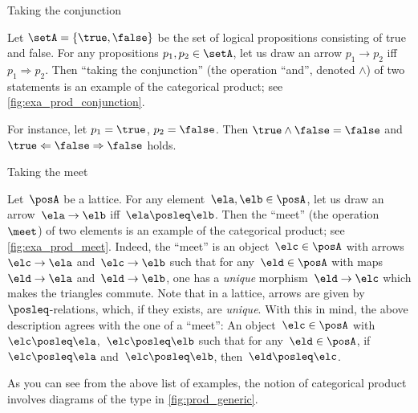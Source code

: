 \begin{marginfigure}
	\centering
	\caption{Taking the conjunction}
	\label{fig:exa_prod_conjunction}
\end{marginfigure}

\begin{example}
	\label{exa:conjunction-as-prod}
	Let $\setA = \{ \true, \false \}$ be the set of logical propositions consisting of true and false.
	For any propositions $p_1, p_2  \in \setA$, let us draw an arrow $p_1 \to p_2$ iff $p_1 \Rightarrow p_2$.
	Then ``taking the conjunction'' (the operation ``and'', denoted $\wedge$) of two statements is an example of the categorical product; see \cref{fig:exa_prod_conjunction}.

	For instance, let $p_1 = \true$, $p_2 = \false$.
	Then $\true \wedge \false = \false$ and $\true \Leftarrow \false \Rightarrow \false$ holds.
\end{example}

\begin{marginfigure}
	\centering
	\caption{Taking the meet}
	\label{fig:exa_prod_meet}
\end{marginfigure}
\begin{example}
	\label{exa:meet-as-prod}
	Let~$\posA$ be a lattice.
	For any element~$\ela, \elb \in \posA$, let us draw an arrow~$\ela \to \elb$ iff~$\ela \posleq \elb$.
	Then the ``meet'' (the operation~$\meet$) of two elements is an example of the categorical product; see \cref{fig:exa_prod_meet}.
	Indeed, the ``meet'' is an object~$\elc \in \posA$ with arrows~$\elc\to \ela$ and~$\elc \to \elb$ such that for any~$\eld\in \posA$ with maps~$\eld\to \ela$ and~$\eld\to \elb$, one has a \emph{unique} morphism~$\eld\to \elc$ which makes the triangles commute.
	Note that in a lattice, arrows are given by~$\posleq$-relations, which, if they exists, are \emph{unique}.
	With this in mind, the above description agrees with the one of a ``meet'':
	An object~$\elc\in \posA$ with $\elc\posleq \ela$,~$\elc\posleq \elb$ such that for any~$\eld\in \posA$, if~$\elc\posleq \ela$ and~$\elc\posleq \elb$, then~$\eld\posleq \elc$.

\end{example}

\begin{marginfigure}
	\centering
	\caption{}
	\label{fig:prod_generic}
\end{marginfigure}

As you can see from the above list of examples, the notion of categorical product involves diagrams of the type in \cref{fig:prod_generic}.

